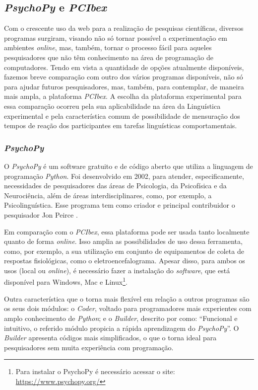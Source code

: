 \documentclass{textolivre}
\begin{document}
\subsection{\emph{PsychoPy} e \emph{PCIbex}}
Com o crescente uso da web para a realização de pesquisas científicas, diversos programas surgiram, visando não só tornar possível a experimentação em ambientes \textit{online}, mas, também, tornar o processo fácil para aqueles pesquisadores que não têm conhecimento na área de programação de computadores. Tendo em vista a quantidade de opções atualmente disponíveis, fazemos breve comparação com outro dos vários programas disponíveis, não só para ajudar futuros pesquisadores, mas, também, para contemplar, de maneira mais ampla, a plataforma \emph{PCIbex}. A escolha da plataforma experimental para essa comparação ocorreu pela sua aplicabilidade na área da Linguística experimental e pela característica comum de possibilidade de mensuração dos tempos de reação dos participantes em tarefas linguísticas comportamentais.

\subsubsection{\emph{PsychoPy}}
O \emph{PsychoPy} é um software gratuito e de código aberto que utiliza a linguagem de programação \emph{Python}. Foi desenvolvido em 2002, para atender, especificamente, necessidades de pesquisadores das áreas de Psicologia, da Psicofísica e da Neurociência, além de áreas interdisciplinares, como, por exemplo, a Psicolinguística. Esse programa tem como criador e principal contribuidor o pesquisador Jon Peirce \cite{peirce2007}.

Em comparação com o \emph{PCIbex}, essa plataforma pode ser usada tanto localmente quanto de forma \textit{online}. Isso amplia as possibilidades de uso dessa ferramenta, como, por exemplo, a sua utilização em conjunto de equipamentos de coleta de respostas fisiológicas, como o eletroencefalograma. Apesar disso, para ambos os usos (local ou \textit{online}), é necessário fazer a instalação do \emph{software}, que está disponível para Windows, Mac e Linux\footnote{Para instalar o PsychoPy é necessário acessar o site: \url{https://www.psychopy.org/}}.

Outra característica que o torna mais flexível em relação a outros programas são os seus dois módulos: o \emph{Coder}, voltado para programadores mais experientes com amplo conhecimento de \emph{Python}; e o \emph{Builder}, descrito por \textcite[p. 665]{limberger2019} como:  “Funcional e intuitivo, o referido módulo propicia a rápida aprendizagem do \emph{PsychoPy}”. O \emph{Builder} apresenta códigos mais simplificados, o que o torna ideal para pesquisadores sem muita experiência com programação.
\end{document}

